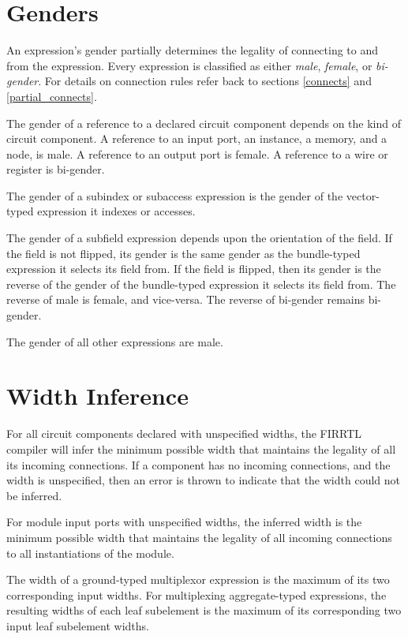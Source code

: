 \documentclass[12pt]{article}
\begin{document}
\section{Genders}\label{genders}

An expression's gender partially determines the legality of connecting to and from the expression. Every expression is classified as either {\em male}, {\em female}, or {\em bi-gender}. For details on connection rules refer back to sections \ref{connects} and \ref{partial_connects}.

The gender of a reference to a declared circuit component depends on the kind of circuit component. A reference to an input port, an instance, a memory, and a node, is male. A reference to an output port is female. A reference to a wire or register is bi-gender.

The gender of a subindex or subaccess expression is the gender of the vector-typed expression it indexes or accesses.

The gender of a subfield expression depends upon the orientation of the field. If the field is not flipped, its gender is the same gender as the bundle-typed expression it selects its field from. If the field is flipped, then its gender is the reverse of the gender of the bundle-typed expression it selects its field from. The reverse of male is female, and vice-versa. The reverse of bi-gender remains bi-gender.

The gender of all other expressions are male.

\section{Width Inference}\label{width_inference}

For all circuit components declared with unspecified widths, the FIRRTL compiler will infer the minimum possible width that maintains the legality of all its incoming connections. If a component has no incoming connections, and the width is unspecified, then an error is thrown to indicate that the width could not be inferred. 

For module input ports with unspecified widths, the inferred width is the minimum possible width that maintains the legality of all incoming connections to all instantiations of the module.

The width of a ground-typed multiplexor expression is the maximum of its two corresponding input widths. For multiplexing aggregate-typed expressions, the resulting widths of each leaf subelement is the maximum of its corresponding two input leaf subelement widths.
\end{document}
